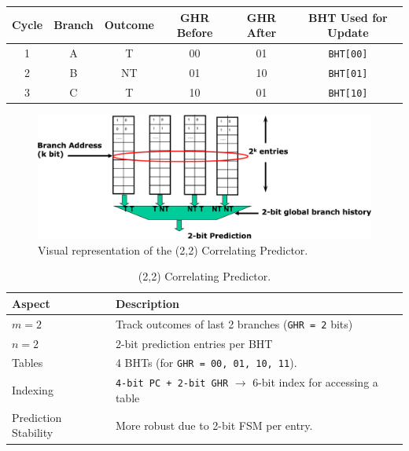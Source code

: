 \highspace
\begin{adjustbox}{width={\textwidth},totalheight={\textheight},keepaspectratio}
    \begin{tabular}{@{} c | c | c | c | c | c @{}}
        \toprule
        Cycle & Branch & Outcome & GHR Before & GHR After & BHT Used for Update \\
        \midrule
        1     & A      & T       & 00         & 01        & \texttt{BHT[00]}             \\ [.5em]
        2     & B      & NT      & 01         & 10        & \texttt{BHT[01]}             \\ [.5em]
        3     & C      & T       & 10         & 01        & \texttt{BHT[10]}             \\
        \bottomrule
    \end{tabular}
\end{adjustbox}

\begin{figure}[!htp]
    \centering
    \includegraphics[width=\textwidth]{img/2-2-correlating-predictors.pdf}
    \caption{Visual representation of the (2,2) Correlating Predictor.}
\end{figure}

\begin{table}[!htp]
    \begin{adjustbox}{width={\textwidth},totalheight={\textheight},keepaspectratio}
        \centering
        \begin{tabular}{@{} l | l @{}}
            \toprule
            \textbf{Aspect} & \textbf{Description} \\
            \midrule
            $m = 2$                 & Track outcomes of last 2 branches (\texttt{GHR = 2} bits) \\ [.5em]
            $n = 2$                 & 2-bit prediction entries per BHT \\ [.5em]
            Tables                  & 4 BHTs (for \texttt{GHR = 00, 01, 10, 11}). \\ [.5em]
            Indexing                & \texttt{4-bit PC + 2-bit GHR} $\rightarrow$ 6-bit index for accessing a table \\ [.5em]
            Prediction Stability    & More robust due to 2-bit FSM per entry. \\
            \bottomrule
        \end{tabular}
    \end{adjustbox}
    \caption{(2,2) Correlating Predictor.}
\end{table}
